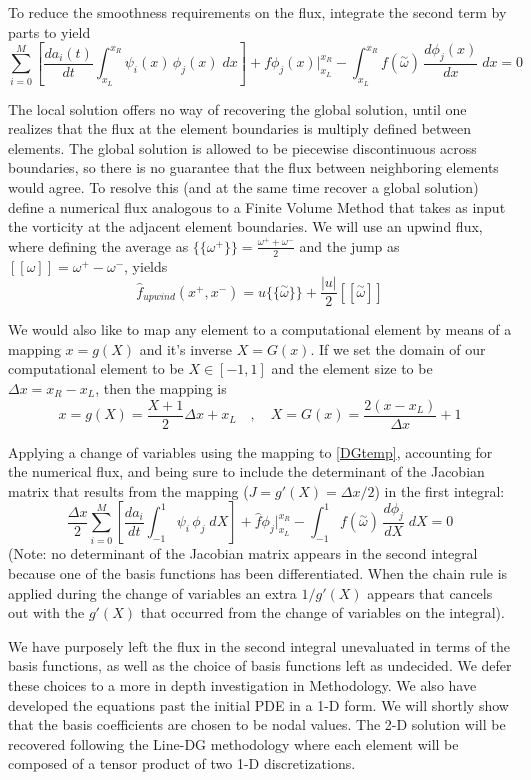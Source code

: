 \documentclass[letterpaper,12pt]{report}
\newcommand{\be}{\begin{equation}}
\newcommand{\ben}[1]{\begin{equation}\label{#1}}
\newcommand{\ee}{\end{equation}}
\newcommand{\aomega}{\overset{\sim}{\omega}}				%
\begin{document}
To reduce the smoothness requirements on the flux, integrate the second term by parts to yield
\ben{DGtemp} \sum_{i=0}^M \left[ \frac{d a_i(t)}{dt}\int_{x_L}^{x_R}\psi_i(x)  \, \phi_j(x) \;dx \right]
+ f\phi_j(x) \Big|^{x_R}_{x_L} 
- \int_{x_L}^{x_R} f(\aomega) \, \frac{d \phi_j(x)}{d x} \;dx = 0 \ee

The local solution offers no way of recovering the global solution, until one realizes that the flux at the element boundaries is multiply defined between elements. The global solution is allowed to be piecewise discontinuous across boundaries, so there is no guarantee that the flux between neighboring elements would agree. To resolve this (and at the same time recover a global solution) define a numerical flux analogous to a Finite Volume Method that takes as input the vorticity at the adjacent element boundaries. We will use an upwind flux, where defining the average as $\{\!\{\omega^+\}\!\} = \frac{\omega^++\omega^-}{2}$ and the jump as $[[\omega]]=\omega^+-\omega^-$, yields
\be \hat{f}_{upwind}(x^+,x^-)=u\{\!\{\aomega\}\!\} + \frac{|u|}{2}[[\aomega]]\ee

We would also like to map any element to a computational element by means of a mapping $x=g(X)$ and it's inverse $X=G(x)$. If we set the domain of our computational element to be $X \in [-1, 1]$ and the element size to be $\Delta x = x_R - x_L$, then the mapping is
\be x=g(X)=\frac{X+1}{2}\Delta x + x_L\quad ,\quad X=G(x)=\frac{2(x-x_L)}{\Delta x}+1 \ee

Applying a change of variables using the mapping to \eqref{DGtemp}, accounting for the numerical flux, and being sure to include the determinant of the Jacobian matrix that results from the mapping ($J=g'(X)=\Delta x/2$) in the first integral:
\ben{DGtemp} \frac{\Delta x}{2}	\sum_{i=0}^M \left[ \frac{d a_i}{dt}	\int_{-1}^{1}\psi_i  \, \phi_j \;dX \right]
+\hat{f}\phi_j \Big|^{x_R}_{x_L} 
- \int_{-1}^{1} f(\aomega) \, \frac{d \phi_j}{dX} \;dX = 0 \ee
(Note: no determinant of the Jacobian matrix appears in the second integral because one of the basis functions has been differentiated. When the chain rule is applied during the change of variables an extra $1/g'(X)$ appears that cancels out with the $g'(X)$ that occurred from the change of variables on the integral).

We have purposely left the flux in the second integral unevaluated in terms of the basis functions, as well as the choice of basis functions left as undecided. We defer these choices to a more in depth investigation in Methodology. We also have developed the equations past the initial PDE in a 1-D form. We will shortly show that the basis coefficients are chosen to be nodal values. The 2-D solution will be recovered following the Line-DG methodology \cite{Persson2013} where each element will be composed of a tensor product of two 1-D discretizations.
\end{document}
